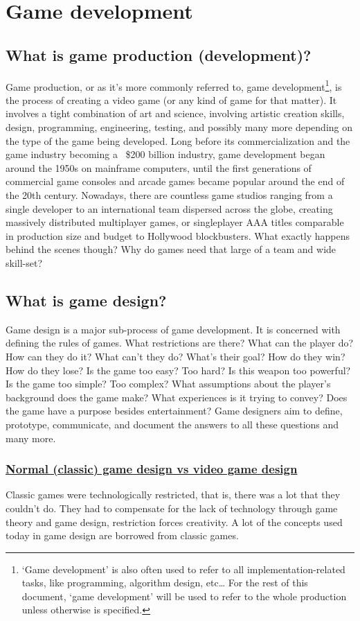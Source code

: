 \documentclass[../main.tex]{subfiles}
\begin{document}
\section{Game development}
\subsection{What is game production (development)?}
Game production, or as it’s more commonly referred to, game development\footnote{‘Game development’ is also often used to refer to all implementation-related tasks, like programming, algorithm design, etc… For the rest of this document, ‘game development’ will be used to refer to the whole production unless otherwise is specified.}, is the process of creating a video game (or any kind of game for that matter). It involves a tight combination of art and science, involving artistic creation skills, design, programming, engineering, testing, and possibly many more depending on the type of the game being developed. Long before its commercialization and the game industry becoming a ~\$200 billion industry, game development began around the 1950s on mainframe computers, until the first generations of commercial game consoles and arcade games became popular around the end of the 20th century. Nowadays, there are countless game studios ranging from a single developer to an international team dispersed across the globe, creating massively distributed multiplayer games, or singleplayer AAA titles comparable in production size and budget to Hollywood blockbusters. What exactly happens behind the scenes though? Why do games need that large of a team and wide skill-set?

\subsection{What is game design?}
Game design is a major sub-process of game development. It is concerned with defining the rules of games. What restrictions are there? What can the player do? How can they do it? What can't they do? What's their goal? How do they win? How do they lose? Is the game too easy? Too hard? Is this weapon too powerful? Is the game too simple? Too complex? What assumptions about the player's background does the game make? What experiences is it trying to convey? Does the game have a purpose besides entertainment? Game designers aim to define, prototype, communicate, and document the answers to all these questions and many more.
\subsubsection*{\underline{Normal (classic) game design vs video game design}}
Classic games were technologically restricted, that is, there was a lot that they couldn't do. They had to compensate for the lack of technology through game theory and game design, restriction forces creativity. A lot of the concepts used today in game design are borrowed from classic games. 
\end{document}
